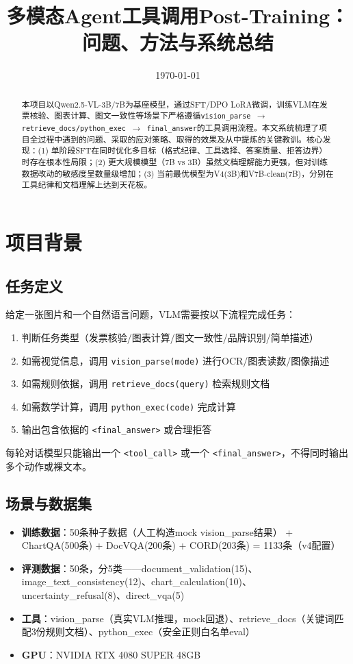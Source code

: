 \documentclass[fontset=none,11pt,a4paper]{ctexart}
\title{多模态Agent工具调用Post-Training：\\问题、方法与系统总结}
\author{}
\date{\today}
\begin{document}
\maketitle

\begin{abstract}
本项目以Qwen2.5-VL-3B/7B为基座模型，通过SFT/DPO LoRA微调，训练VLM在发票核验、图表计算、图文一致性等场景下严格遵循\texttt{vision\_parse $\to$ retrieve\_docs/python\_exec $\to$ final\_answer}的工具调用流程。本文系统梳理了项目全过程中遇到的问题、采取的应对策略、取得的效果及从中提炼的关键教训。核心发现：(1) 单阶段SFT在同时优化多目标（格式纪律、工具选择、答案质量、拒答边界）时存在根本性局限；(2) 更大规模模型（7B vs 3B）虽然文档理解能力更强，但对训练数据改动的敏感度呈数量级增加；(3) 当前最优模型为V4(3B)和V7B-clean(7B)，分别在工具纪律和文档理解上达到天花板。
\end{abstract}

\section{项目背景}

\subsection{任务定义}
给定一张图片和一个自然语言问题，VLM需要按以下流程完成任务：
\begin{enumerate}[label=(\arabic*)]
    \item 判断任务类型（发票核验/图表计算/图文一致性/品牌识别/简单描述）
    \item 如需视觉信息，调用 \texttt{vision\_parse(mode)} 进行OCR/图表读数/图像描述
    \item 如需规则依据，调用 \texttt{retrieve\_docs(query)} 检索规则文档
    \item 如需数学计算，调用 \texttt{python\_exec(code)} 完成计算
    \item 输出包含依据的 \texttt{<final\_answer>} 或合理拒答
\end{enumerate}

每轮对话模型只能输出一个 \texttt{<tool\_call>} 或一个 \texttt{<final\_answer>}，不得同时输出多个动作或裸文本。

\subsection{场景与数据集}
\begin{itemize}[nosep]
    \item \textbf{训练数据}：50条种子数据（人工构造mock vision\_parse结果） + ChartQA(500条) + DocVQA(200条) + CORD(203条) = 1133条（v4配置）
    \item \textbf{评测数据}：50条，分5类------document\_validation(15)、image\_text\_consistency(12)、chart\_calculation(10)、uncertainty\_refusal(8)、direct\_vqa(5)
    \item \textbf{工具}：vision\_parse（真实VLM推理，mock回退）、retrieve\_docs（关键词匹配3份规则文档）、python\_exec（安全正则白名单eval）
    \item \textbf{GPU}：NVIDIA RTX 4080 SUPER 48GB
\end{itemize}
\end{document}
